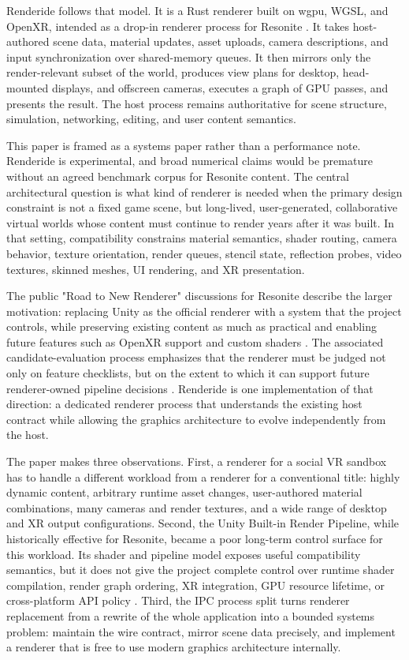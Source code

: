 \documentclass[acmtog,screen,nonacm]{acmart}
\begin{document}
Renderide follows that model. It is a Rust renderer built on wgpu, WGSL, and OpenXR, intended as a drop-in renderer process for Resonite \citep{renderideRepo}. It takes host-authored scene data, material updates, asset uploads, camera descriptions, and input synchronization over shared-memory queues. It then mirrors only the render-relevant subset of the world, produces view plans for desktop, head-mounted displays, and offscreen cameras, executes a graph of GPU passes, and presents the result. The host process remains authoritative for scene structure, simulation, networking, editing, and user content semantics.

This paper is framed as a systems paper rather than a performance note. Renderide is experimental, and broad numerical claims would be premature without an agreed benchmark corpus for Resonite content. The central architectural question is what kind of renderer is needed when the primary design constraint is not a fixed game scene, but long-lived, user-generated, collaborative virtual worlds whose content must continue to render years after it was built. In that setting, compatibility constrains material semantics, shader routing, camera behavior, texture orientation, render queues, stencil state, reflection probes, video textures, skinned meshes, UI rendering, and XR presentation.

The public "Road to New Renderer" discussions for Resonite describe the larger motivation: replacing Unity as the official renderer with a system that the project controls, while preserving existing content as much as practical and enabling future features such as OpenXR support and custom shaders \citep{roadToNewRenderer,newRendererRequirements}. The associated candidate-evaluation process emphasizes that the renderer must be judged not only on feature checklists, but on the extent to which it can support future renderer-owned pipeline decisions \citep{renderiteCandidates}. Renderide is one implementation of that direction: a dedicated renderer process that understands the existing host contract while allowing the graphics architecture to evolve independently from the host.

The paper makes three observations. First, a renderer for a social VR sandbox has to handle a different workload from a renderer for a conventional title: highly dynamic content, arbitrary runtime asset changes, user-authored material combinations, many cameras and render textures, and a wide range of desktop and XR output configurations. Second, the Unity Built-in Render Pipeline, while historically effective for Resonite, became a poor long-term control surface for this workload. Its shader and pipeline model exposes useful compatibility semantics, but it does not give the project complete control over runtime shader compilation, render graph ordering, XR integration, GPU resource lifetime, or cross-platform API policy \citep{unityBuiltIn,unityFeatureComparison,unityShaderLabSubShader}. Third, the IPC process split turns renderer replacement from a rewrite of the whole application into a bounded systems problem: maintain the wire contract, mirror scene data precisely, and implement a renderer that is free to use modern graphics architecture internally.
\end{document}
